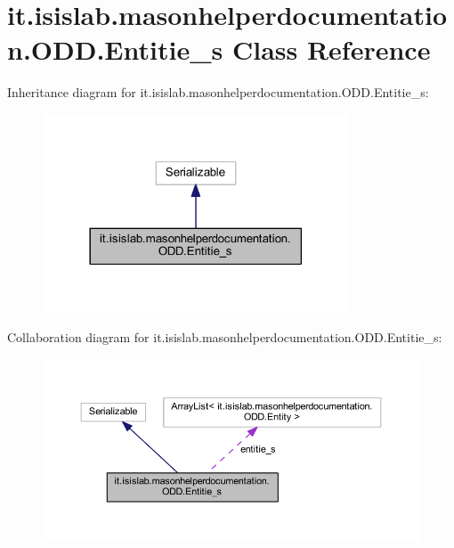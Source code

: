 \hypertarget{classit_1_1isislab_1_1masonhelperdocumentation_1_1_o_d_d_1_1_entitie__s}{\section{it.\-isislab.\-masonhelperdocumentation.\-O\-D\-D.\-Entitie\-\_\-s Class Reference}
\label{classit_1_1isislab_1_1masonhelperdocumentation_1_1_o_d_d_1_1_entitie__s}
}


Inheritance diagram for it.\-isislab.\-masonhelperdocumentation.\-O\-D\-D.\-Entitie\-\_\-s\-:
\nopagebreak
\begin{figure}[H]
\begin{center}
\leavevmode
\includegraphics[width=258pt]{classit_1_1isislab_1_1masonhelperdocumentation_1_1_o_d_d_1_1_entitie__s__inherit__graph}
\end{center}
\end{figure}


Collaboration diagram for it.\-isislab.\-masonhelperdocumentation.\-O\-D\-D.\-Entitie\-\_\-s\-:
\nopagebreak
\begin{figure}[H]
\begin{center}
\leavevmode
\includegraphics[width=350pt]{classit_1_1isislab_1_1masonhelperdocumentation_1_1_o_d_d_1_1_entitie__s__coll__graph}
\end{center}
\end{figure}
